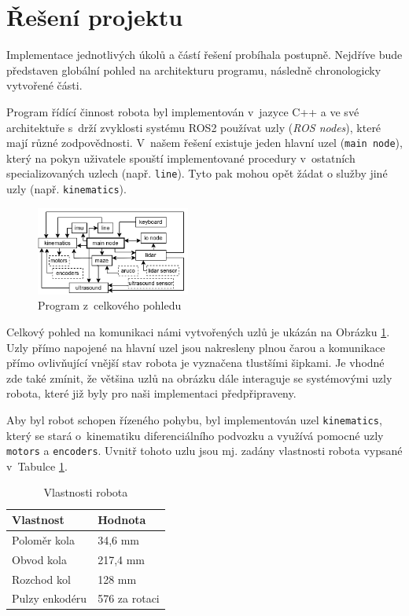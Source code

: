 \section{Řešení projektu}

Implementace jednotlivých úkolů a částí řešení probíhala postupně. Nejdříve bude představen globální pohled na architekturu programu, následně chronologicky vytvořené části.

Program řídící činnost robota byl implementován v~jazyce C++ a ve své architektuře s~drží zvyklosti systému ROS2 \cite{ros} používat uzly (\textit{ROS nodes}), které mají různé zodpovědnosti. V~našem řešení existuje jeden hlavní uzel (\texttt{main node}), který na pokyn uživatele spouští implementované procedury v~ostatních specializovaných uzlech (např. \texttt{line}). Tyto pak mohou opět žádat o služby jiné uzly (např. \texttt{kinematics}).

\begin{figure}[h]
    \centering
    \includegraphics[width=0.45\textwidth]{images/nodes_schematic.png}
    \caption{Program z~celkového pohledu}
    \label{fig:program_obr}
\end{figure}

Celkový pohled na komunikaci námi vytvořených uzlů je ukázán na Obrázku \ref{fig:program_obr}. Uzly přímo napojené na hlavní uzel jsou nakresleny plnou čarou a komunikace přímo ovlivňující vnější stav robota je vyznačena tlustšími šipkami. Je vhodné zde také zmínit, že většina uzlů na obrázku dále interaguje se systémovými uzly robota, které již byly pro naši implementaci předpřipraveny.

Aby byl robot schopen řízeného pohybu, byl implementován uzel \texttt{kinematics}, který se stará o~kinematiku diferenciálního podvozku a využívá pomocné uzly \texttt{motors} a \texttt{encoders}. Uvnitř tohoto uzlu jsou mj. zadány vlastnosti robota vypsané v~Tabulce \ref{tab:vlastnosi}.

\begin{table}[]
    \centering
    \begin{tabular}{|l|l|}
        \hline
        \textbf{Vlastnost} & \textbf{Hodnota} \\ \hline
        Poloměr kola & 34,6 mm \\ \hline
        Obvod kola & 217,4 mm \\ \hline
        Rozchod kol & 128 mm \\ \hline
        Pulzy enkodéru & 576 za rotaci \\ \hline
    \end{tabular}
    \caption{Vlastnosti robota}
    \label{tab:vlastnosi}
\end{table}


